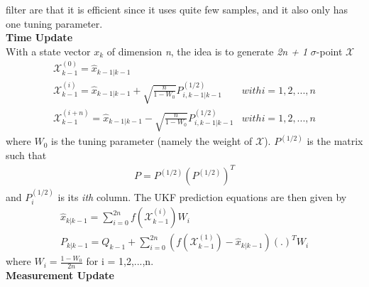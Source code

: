 \begin{itemize}
                        filter are that it is efficient since it uses quite few samples, and it also only has one tuning parameter. \\ 
                        \vspace{3mm}
                             \textbf{Time Update} \\ 
                                \vspace{3mm}
                                With a state vector \emph{$x_k$} of dimension \emph{n}, the idea is to generate \emph{2n + 1} $\sigma$-point $\mathcal{X}$
                                \begin{align}
                                    \mathcal{X}_{k-1}^{(0)} = \hat{x}_{k-1|k-1} \\
                                    \mathcal{X}_{k-1}^{(i)} = \hat{x}_{k-1|k-1} + \sqrt{\frac{n}{1-W_0}} P_{i,k-1|k-1}^{(1/2)} & with i = 1,2,...,n \\
                                    \mathcal{X}_{k-1}^{(i+n)} = \hat{x}_{k-1|k-1} - \sqrt{\frac{n}{1-W_0}} P_{i,k-1|k-1}^{(1/2)} & with i = 1,2,...,n 
                                \end{align}
                                where \emph{$W_0$} is the tuning parameter (namely the weight of $\mathcal{X}$). \textbf{$P^{(1/2)}$} is the matrix such that
                                \begin{align}
                                    P = P^{(1/2)} (P^{(1/2)})^T
                                \end{align}
                                and \emph{$P_i^(1/2)$} is its \emph{ith} column. The UKF prediction equations are then given by
                                \begin{align}
                                    \hat{x}_{k|k-1} = \displaystyle\sum_{i=0}^{2n} f(\mathcal{X}_{k-1}^{(i)}) W_i \\
                                    P_{k|k-1} = Q_{k-1} + \displaystyle\sum_{i=0}^{2n} (f(\mathcal{X}_{k-1}^{(1)}) - \hat{x}_{k|k-1}) (.)^T W_i
                                \end{align} 
                                where $W_i = \frac{1-W_0}{2n}$ for i = 1,2,...,n. \\ 
                                \vspace{3mm}
                             \textbf{Measurement Update} \\ 
                            \vspace{3mm}

\end{itemize}
